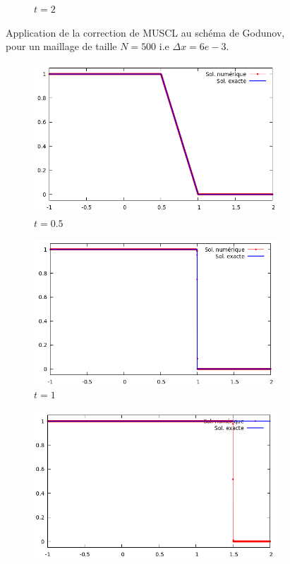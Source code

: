 \documentclass[
	french,
	11pt, %
]{fphw}
\begin{document}
\begin{figure}[H]
\begin{subfigure}{0.32\textwidth}
		\caption{$t=2$}
		\label{fig:MusclFaux2}
	\end{subfigure}
	\caption{Application de la correction de MUSCL au schéma de Godunov, pour un maillage de taille $N=500$ i.e $\Delta x = 6e-3$.}
	\label{fig:Muscl2}
\end{figure}

\begin{figure}[H]
	\centering
	\begin{subfigure}{0.32\textwidth}
		\centering
		\includegraphics[width=\textwidth]{Muscl8.png}
		\caption{$t=0.5$}
	\end{subfigure}
	\begin{subfigure}{0.32\textwidth}
		\centering
		\includegraphics[width=\textwidth]{Muscl9.png}
		\caption{$t=1$}
	\end{subfigure}
	\begin{subfigure}{0.32\textwidth}
		\centering
		\includegraphics[width=\textwidth]{Muscl10.png}

\end{subfigure}
\end{figure}
\end{document}

